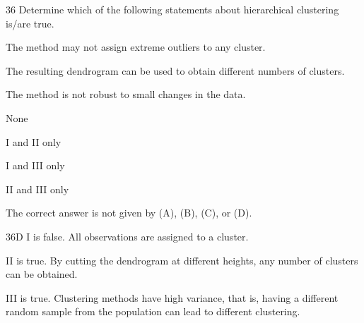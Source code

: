 \begin{question}{36}
Determine which of the following statements about hierarchical clustering is/are true.
\begin{statements}
\item The method may not assign extreme outliers to any cluster.
\item The resulting dendrogram can be used to obtain different numbers of clusters.
\item The method is not robust to small changes in the data.
\end{statements}

\begin{choices}
\item None
\item I and II only
\item I and III only
\item II and III only
\item The correct answer is not given by (A), (B), (C), or (D).
\end{choices}
\end{question}
\begin{solution}{36}{D}
I is false. All observations are assigned to a cluster.

II is true. By cutting the dendrogram at different heights, any number of clusters can be obtained.

III is true. Clustering methods have high variance, that is, having a different random sample from the population can lead to different clustering.
\end{solution}

